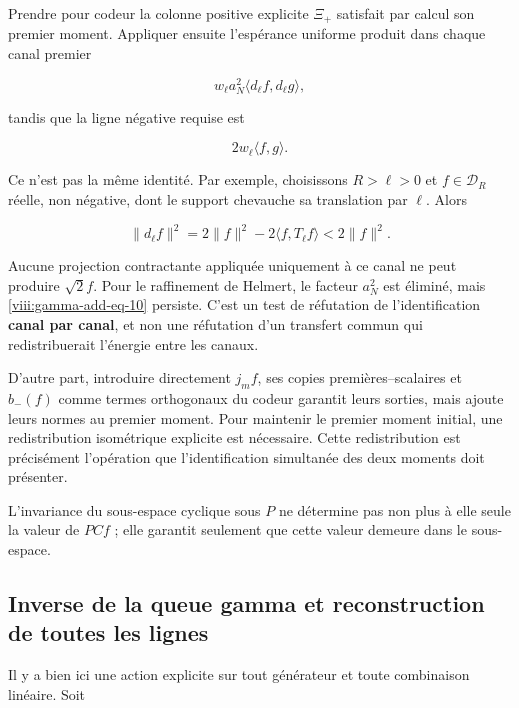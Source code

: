 Prendre pour codeur la colonne positive explicite \(\Xi_+\) satisfait par calcul son premier moment. Appliquer ensuite l'espérance uniforme produit dans chaque canal premier

\begin{equation}
w_\ell a_N^2\langle d_\ell f,d_\ell g\rangle,
\label{viii:gamma-add-display-22}
\end{equation}

tandis que la ligne négative requise est

\begin{equation}
2w_\ell\langle f,g\rangle.
\label{viii:gamma-add-display-23}
\end{equation}

Ce n'est pas la même identité. Par exemple, choisissons \(R>\ell>0\) et \(f\in\mathcal D_R\) réelle, non négative, dont le support chevauche sa translation par \(\ell\). Alors

\begin{equation}
\|d_\ell f\|^2
=2\|f\|^2-2\langle f,T_\ell f\rangle
<2\|f\|^2.
\label{viii:gamma-add-eq-10}
\end{equation}

Aucune projection contractante appliquée uniquement à ce canal ne peut produire \(\sqrt2f\). Pour le raffinement de Helmert, le facteur \(a_N^2\) est éliminé, mais \eqref{viii:gamma-add-eq-10} persiste. C'est un test de réfutation de l'identification \textbf{canal par canal}, et non une réfutation d'un transfert commun qui redistribuerait l'énergie entre les canaux.

D'autre part, introduire directement \(j_mf\), ses copies premières--scalaires et \(b_-(f)\) comme termes orthogonaux du codeur garantit leurs sorties, mais ajoute leurs normes au premier moment. Pour maintenir le premier moment initial, une redistribution isométrique explicite est nécessaire. Cette redistribution est précisément l'opération que l'identification simultanée des deux moments doit présenter.

L'invariance du sous-espace cyclique sous \(P\) ne détermine pas non plus à elle seule la valeur de \(PCf\) ; elle garantit seulement que cette valeur demeure dans le sous-espace.

\subsection{Inverse de la queue gamma et reconstruction de toutes les lignes}
\label{viii:gamma-add-sub-288}

Il y a bien ici une action explicite sur tout générateur et toute combinaison linéaire. Soit

